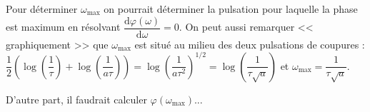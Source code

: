 \documentclass[10pt,fleqn]{article} %
\begin{document}
\begin{demo}
Pour déterminer $\omega_{\max}$ on pourrait déterminer la pulsation pour laquelle la phase est maximum en résolvant $\dfrac{\text{d}\varphi\left(\omega \right)}{\text{d}\omega}=0$. 
On peut aussi remarquer << graphiquement >> que $\omega_{\text{max}}$ est situé au milieu des deux pulsations de coupures : $\dfrac{1}{2}\left(\log \left(\dfrac{1}{\tau}\right)+\log \left(\dfrac{1}{a\tau}\right)\right)=\log \left(\dfrac{1}{a\tau^2}\right)^{1/2}=\log \left(\dfrac{1}{\tau\sqrt{a}}\right)$ et $\omega_{\text{max}}=\dfrac{1}{\tau\sqrt{a}}$.

D'autre part, il faudrait calculer 
$\varphi\left(\omega_{\text{max}}\right)$...
%
%
%
%
%

\end{demo}
\end{document}
